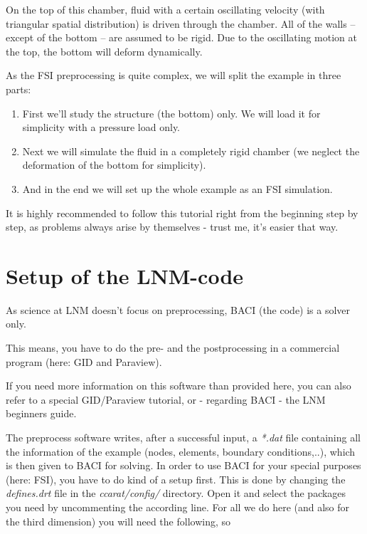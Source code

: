 On the top of this chamber, fluid with a certain oscillating velocity
(with triangular spatial distribution) is driven through the chamber. All
of the walls -- except of the bottom -- are assumed to be rigid. Due
to the oscillating motion at the top, the bottom will deform dynamically.

As the FSI preprocessing is quite complex, we will split the example
in three parts:

\begin{enumerate}
\item First we'll study the structure (the bottom) only. We will load it
for simplicity with a pressure load only.
\item Next we will simulate the fluid in a completely rigid chamber (we
neglect the deformation of the bottom for simplicity).
\item And in the end we will set up the whole example as an FSI simulation.
\end{enumerate}
It is highly recommended to follow this tutorial right from the beginning
step by step, as problems always arise by themselves - trust me, it's
easier that way.


\section{Setup of the LNM-code}

As science at LNM doesn't focus on preprocessing, BACI (the code)
is a solver only.

This means, you have to do the pre- and the postprocessing in a commercial
program (here: GID and Paraview).

If you need more information on this software than provided here,
you can also refer to a special GID/Paraview tutorial, or - regarding
BACI - the LNM beginners guide.

The preprocess software writes, after a successful input, a \emph{{*}.dat}
file containing all the information of the example (nodes, elements,
boundary conditions,..), which is then given to BACI for solving.
In order to use BACI for your special purposes (here: FSI), you have
to do kind of a setup first. This is done by changing the \emph{defines.drt}
file in the \emph{ccarat/config/} directory. Open it and select the
packages you need by uncommenting the according line. For all we do
here (and also for the third dimension) you will need the following,
so

